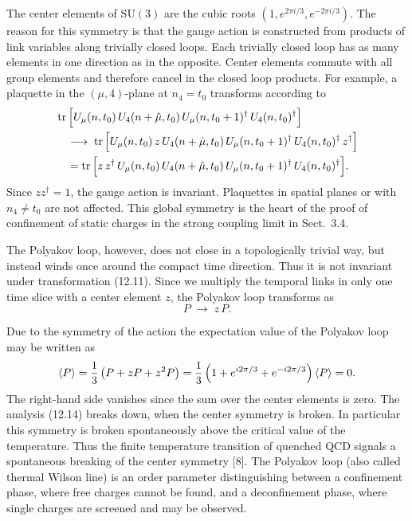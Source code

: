 The center elements of $\mathrm{SU}(3)$ are the cubic roots
$(1, e^{2\pi i/3}, e^{-2\pi i/3})$. The reason for this symmetry is that the
gauge action is constructed from products of link variables along trivially
closed loops. Each trivially closed loop has as many elements in one direction
as in the opposite. Center elements commute with all group elements and
therefore cancel in the closed loop products. For example, a plaquette in the
$(\mu,4)$-plane at $n_4 = t_0$ transforms according to
\begin{equation}
\begin{split}
  &\operatorname{tr}\Big[U_\mu(n,t_0)\,U_4(n+\hat{\mu},t_0)\,U_\mu(n,t_0+1)^\dagger\,
    U_4(n,t_0)^\dagger\Big] \\
  &\quad\longrightarrow\;
  \operatorname{tr}\Big[U_\mu(n,t_0)\,z\,U_4(n+\hat{\mu},t_0)\,U_\mu(n,t_0+1)^\dagger\,
    U_4(n,t_0)^\dagger\,z^\dagger\Big] \\
  &\quad= \operatorname{tr}\Big[z\,z^\dagger\,U_\mu(n,t_0)\,U_4(n+\hat{\mu},t_0)\,
    U_\mu(n,t_0+1)^\dagger\,U_4(n,t_0)^\dagger\Big].
\end{split}
\end{equation}
Since $zz^\dagger = 1$, the gauge action is invariant. Plaquettes in spatial
planes or with $n_4 \ne t_0$ are not affected. This global symmetry is the
heart of the proof of confinement of static charges in the strong coupling
limit in Sect.~3.4.

The Polyakov loop, however, does not close in a topologically trivial way, but
instead winds once around the compact time direction. Thus it is not invariant
under transformation (12.11). Since we multiply the temporal links in only one
time slice with a center element $z$, the Polyakov loop transforms as
\begin{equation}
  P \;\to\; z\,P.
\end{equation}

Due to the symmetry of the action the expectation value of the Polyakov loop may
be written as
\begin{equation}
  \left\langle P \right\rangle = \frac{1}{3}\left(P + zP + z^2P\right)
    = \frac{1}{3}\left(1 + e^{i2\pi/3} + e^{-i2\pi/3}\right)\left\langle P \right\rangle = 0 .
\end{equation}
The right-hand side vanishes since the sum over the center elements is zero.
The analysis (12.14) breaks down, when the center symmetry is broken. In
particular this symmetry is broken spontaneously above the critical value of
the temperature. Thus the finite temperature transition of quenched QCD signals
a spontaneous breaking of the center symmetry [8]. The Polyakov loop (also
called thermal Wilson line) is an order parameter distinguishing between a
confinement phase, where free charges cannot be found, and a deconfinement
phase, where single charges are screened and may be observed.

